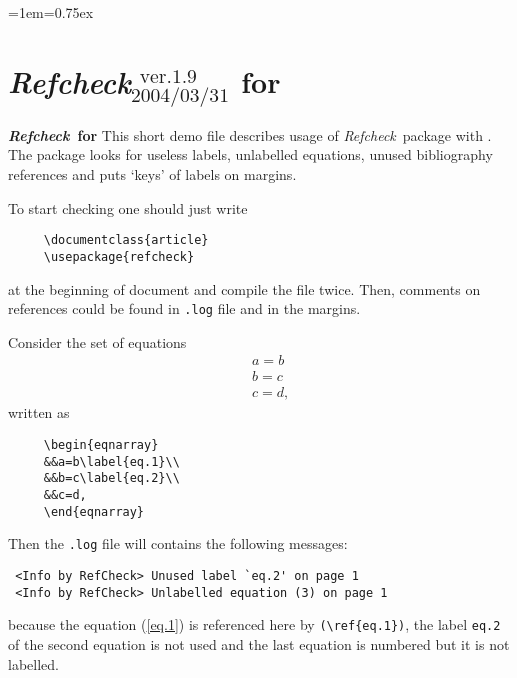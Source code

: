 \documentclass[11pt]{article}
\begin{document}
\baselineskip=4.5mm
\baselineskip
\pagestyle{myheadings}

\parindent=1em\parskip=0.75ex
\makeatletter

\thispagestyle{empty}

\enlargethispage{-8mm}

\def\RefCheck{\textsl{Refcheck\/}}
\def\AmS{\mbox{$\mathcal{A}$\kern-0.17em\raise-2.1pt\hbox{$\mathcal{M}$}%
\kern-0.115em$\mathcal{S}$}}
\renewcommand{\refname}{{\normalsize References}}
\def\curversion{1.9}
\def\curvertime{2004/03/31}

\section*{\RefCheck{\tiny${}^{\mathrm{\ \ ver.
\curversion}}_{\mathrm{\curvertime}}$} for \LaTeXe}
\markboth{\hfill\bfseries\RefCheck\ for \LaTeXe\hfill}%
{\hfill\bfseries\RefCheck\ for \LaTeXe\hfill}
This short demo file describes usage of \RefCheck\ package
with \LaTeXe. The package looks for useless labels,
unlabelled equations, unused bibliography references
and puts `keys' of labels on margins.

To start checking one should just write
\begin{verbatim}
     \documentclass{article}
     \usepackage{refcheck}
\end{verbatim}
at the beginning of document and compile the file twice.
Then, comments on references could be found in \texttt{.log} file and
in the margins.

Consider the set of equations
\begin{eqnarray}
&&a=b\label{eq.1}\\
&&b=c\label{eq.2}\\
&&c=d,
\end{eqnarray}
written as
\begin{verbatim}
     \begin{eqnarray}
     &&a=b\label{eq.1}\\
     &&b=c\label{eq.2}\\
     &&c=d,
     \end{eqnarray}
\end{verbatim}
Then the \texttt{.log} file will contains the following messages:
{\small
\begin{verbatim}
 <Info by RefCheck> Unused label `eq.2' on page 1
 <Info by RefCheck> Unlabelled equation (3) on page 1
\end{verbatim}
}
\noindent
because the equation (\ref{eq.1}) is
referenced here by \verb#(\ref{eq.1})#, the label {\tt eq.2} of the second
equation is not used and the last equation is numbered but it is not
labelled.
\end{document}
